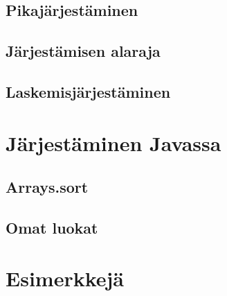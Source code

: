 \subsection{Pikajärjestäminen}

\subsection{Järjestämisen alaraja}

\subsection{Laskemisjärjestäminen}

\section{Järjestäminen Javassa}

\subsection{Arrays.sort}

\subsection{Omat luokat}

\section{Esimerkkejä}
